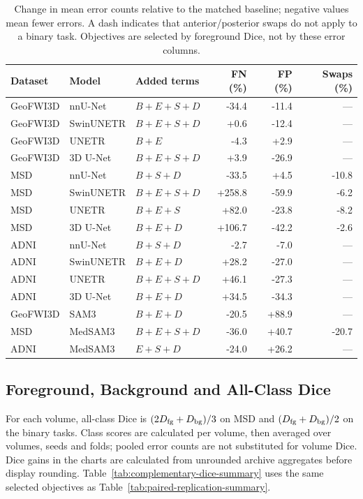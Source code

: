 \documentclass[12pt,a4paper]{article}
\begin{document}
\begin{table}[htbp]
\centering\footnotesize{}
\setlength{\tabcolsep}{4pt}\renewcommand{\arraystretch}{1.15}
\begin{tabular}{@{}lllrrr@{}}
\hline
Dataset & Model & Added terms & FN (\%) & FP (\%) & Swaps (\%) \\
\hline
GeoFWI3D & nnU-Net & $B+E+S+D$ & -34.4 & -11.4 & --- \\
GeoFWI3D & SwinUNETR & $B+E+S+D$ & +0.6 & -12.4 & --- \\
GeoFWI3D & UNETR & $B+E$ & -4.3 & +2.9 & --- \\
GeoFWI3D & 3D U-Net & $B+E+S+D$ & +3.9 & -26.9 & --- \\
MSD & nnU-Net & $B+S+D$ & -33.5 & +4.5 & -10.8 \\
MSD & SwinUNETR & $B+E+S+D$ & +258.8 & -59.9 & -6.2 \\
MSD & UNETR & $B+E+S$ & +82.0 & -23.8 & -8.2 \\
MSD & 3D U-Net & $B+E+D$ & +106.7 & -42.2 & -2.6 \\
ADNI & nnU-Net & $B+S+D$ & -2.7 & -7.0 & --- \\
ADNI & SwinUNETR & $B+E+D$ & +28.2 & -27.0 & --- \\
ADNI & UNETR & $B+E+S+D$ & +46.1 & -27.3 & --- \\
ADNI & 3D U-Net & $B+E+D$ & +34.5 & -34.3 & --- \\
GeoFWI3D & SAM3 & $B+E+D$ & -20.5 & +88.9 & --- \\
MSD & MedSAM3 & $B+E+S+D$ & -36.0 & +40.7 & -20.7 \\
ADNI & MedSAM3 & $E+S+D$ & -24.0 & +26.2 & --- \\
\hline
\end{tabular}
\caption{Change in mean error counts relative to the matched baseline; negative values mean fewer errors. A dash indicates that anterior/posterior swaps do not apply to a binary task. Objectives are selected by foreground Dice, not by these error columns.}
\label{tab:selected-error-tradeoffs}
\end{table}


\subsection{Foreground, Background and All-Class Dice}
\label{sec:metric-sensitivity-details}
For each volume, all-class Dice is $(2D_{\rm fg}+D_{\rm bg})/3$ on
MSD and $(D_{\rm fg}+D_{\rm bg})/2$ on the binary tasks. Class scores
are calculated per volume, then averaged over volumes, seeds and folds;
pooled error counts are not substituted for volume Dice.
Dice gains in the charts are calculated from unrounded archive
aggregates before display rounding.
Table~\ref{tab:complementary-dice-summary} uses the same selected
objectives as Table~\ref{tab:paired-replication-summary}.
\end{document}
